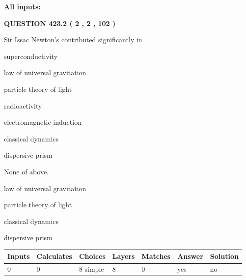 \documentclass[12pt]{article}
\begin{document}
   
   
   
\noindent{}
   
   
   
   
\noindent\vspace{0.1in}\hspace{-0.08in} {\textbf{\Large{All inputs: }}}
   
   
  
\vspace{0.2in}
  
{\textbf{\Large{QUESTION
423.2 
 ( 2 , 2 , 102 )
}}}
  
  
Sir Issac Newton's contributed significantly in
 
 
superconductivity
 
 
law of universal gravitation
 
 
particle theory of light
 
 
radioactivity
 
 
electromagnetic induction
 
 
classical dynamics
 
 
dispersive prism
 
 
 None of above.
 
 
\noindent{}
 
 
law of universal gravitation
 
 
particle theory of light
 
 
classical dynamics
 
 
dispersive prism
 
 
\noindent{}
 
 
   
   
   
   
\noindent\begin{tabular}{|l|l|l|l|l|l|l|}
 \hline
Inputs & Calculates & Choices & Layers & Matches & Answer & Solution \\ \hline
 0  & 
 0  & 
 8
  simple  
  & 
 8  & 
 0  & 
  yes & 
  no 
  \\ \hline
 \end{tabular}
   
\end{document}
